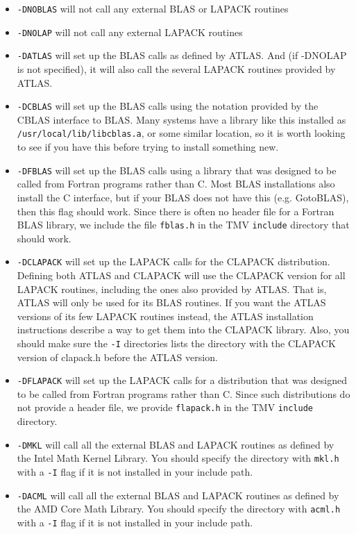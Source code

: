 \begin{itemize}
\item
\texttt{-DNOBLAS} will not call any external BLAS or LAPACK routines
\item
\texttt{-DNOLAP} will not call any external LAPACK routines
\item
\texttt{-DATLAS} will set up the BLAS calls as defined by ATLAS.  And (if -DNOLAP
is not specified), it will also call the several LAPACK routines
provided by ATLAS.
\item
\texttt{-DCBLAS} will set up the BLAS calls using the notation provided by the 
CBLAS interface to BLAS.  Many systems have a library like this installed as 
\texttt{/usr/local/lib/libcblas.a}, or some similar location,
so it is worth looking to see if you have this before
trying to install something new.
\item
\texttt{-DFBLAS} will set up the BLAS calls using a library that was designed to be called
from Fortran programs rather than C.  
Most BLAS installations also install the C interface, but if your
BLAS does not have this (e.g. GotoBLAS), then this flag should work.  
Since there is often no
header file for a Fortran BLAS library, we include the file \texttt{fblas.h} in the TMV 
\texttt{include} directory that should work.
\item
\texttt{-DCLAPACK} will set up the LAPACK calls for the CLAPACK distribution.  
Defining both ATLAS and CLAPACK will use
the CLAPACK version for all LAPACK routines, including the ones also provided by 
ATLAS.  That is, ATLAS will only be used for its BLAS routines.  If you want
the ATLAS versions of its few LAPACK routines instead, the ATLAS 
installation instructions describe a way to get them into the CLAPACK library.
Also, you should make sure the \texttt{-I} directories lists the directory with the CLAPACK
version of clapack.h before the ATLAS version.
\item
\texttt{-DFLAPACK} will set up the LAPACK calls for a distribution that
was designed to be called from Fortran programs rather than C.  Since such distributions
do not provide a header file, we provide \texttt{flapack.h} in the TMV \texttt{include} directory.
\item
\texttt{-DMKL} will call all the external BLAS and LAPACK routines as defined by the
Intel Math Kernel Library.  You should specify the directory with \texttt{mkl.h} with a 
\texttt{-I} flag if it is not installed in your include path.
\item
\texttt{-DACML} will call all the external BLAS and LAPACK routines as defined by the 
AMD Core Math Library.  You should specify the directory with \texttt{acml.h} with a 
\texttt{-I} flag if it is not installed in your include path.
\end{itemize}
